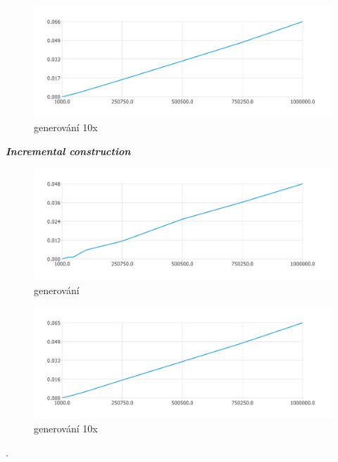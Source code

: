 \documentclass{article}
\begin{document}
\begin{figure}[htbp]
\centering
        \includegraphics[clip, trim=0cm 0cm 0cm 0cm, width=1\textwidth]{clq.pdf}
        \caption{generování 10x}
\end{figure}
\clearpage
\newpage
\textit{\textbf {Incremental construction}}
\\
\begin{figure}[htbp]
\centering
        \includegraphics[clip, trim=0cm 0cm 0cm 0cm, width=1\textwidth]{pdf25.pdf}
        \caption{generování}
\end{figure}
\begin{figure}[htbp]
\centering
        \includegraphics[clip, trim=0cm 0cm 0cm 0cm, width=1\textwidth]{cli.pdf}
        \caption{generování 10x}
\end{figure}
.\\
\bigskip
\clearpage
\end{document}
